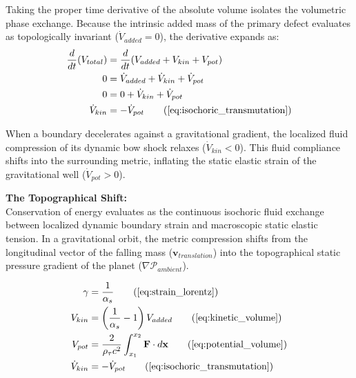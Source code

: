 \documentclass[11pt, a4paper]{article}
\begin{document}
Taking the proper time derivative of the absolute volume isolates the volumetric phase exchange. Because the intrinsic added mass of the primary defect evaluates as topologically invariant ($\dot{V}_{added} = 0$), the derivative expands as:
\begin{align}
    \frac{d}{dt} (V_{total}) &= \frac{d}{dt} (V_{added} + V_{kin} + V_{pot}) \nonumber \\
    0 &= \dot{V}_{added} + \dot{V}_{kin} + \dot{V}_{pot} \nonumber \\
    0 &= 0 + \dot{V}_{kin} + \dot{V}_{pot} \nonumber \\
    \dot{V}_{kin} &= -\dot{V}_{pot} \tag{\ref{eq:isochoric_transmutation}}
\end{align}

When a boundary decelerates against a gravitational gradient, the localized fluid compression of its dynamic bow shock relaxes ($\dot{V}_{kin} < 0$). This fluid compliance shifts into the surrounding metric, inflating the static elastic strain of the gravitational well ($\dot{V}_{pot} > 0$). 

\vspace{0.2cm}
\textbf{The Topographical Shift:} \\
Conservation of energy evaluates as the continuous isochoric fluid exchange between localized dynamic boundary strain and macroscopic static elastic tension. In a gravitational orbit, the metric compression shifts from the longitudinal vector of the falling mass ($\mathbf{v}_{translation}$) into the topographical static pressure gradient of the planet ($\nabla \mathcal{P}_{ambient}$).

\begin{tcolorbox}[recallbox, title={\ref{box:volumetric_energy}. Kinetic-Potential Strain Conservation}]
\begin{align}
    \gamma &= \frac{1}{\alpha_s} \tag{\ref{eq:strain_lorentz}} \\
    V_{kin} &= \left( \frac{1}{\alpha_s} - 1 \right) V_{added} \tag{\ref{eq:kinetic_volume}} \\
    V_{pot} &= \frac{2}{\rho_{\tau} c^2} \int_{x_1}^{x_2} \mathbf{F} \cdot d\mathbf{x} \tag{\ref{eq:potential_volume}} \\
    \dot{V}_{kin} &= -\dot{V}_{pot} \tag{\ref{eq:isochoric_transmutation}}
\end{align}
\end{tcolorbox}



\end{document}

